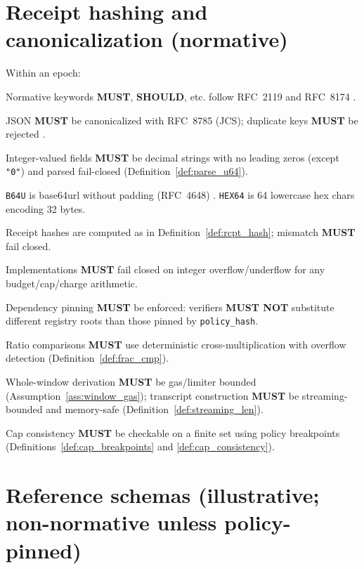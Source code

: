 \documentclass[11pt]{article}
\newcommand{\MUST}{\textbf{MUST}}
\newcommand{\MUSTNOT}{\textbf{MUST NOT}}
\newcommand{\SHOULD}{\textbf{SHOULD}}
\newcommand{\code}[1]{\texttt{#1}}
\newcommand{\1}{\mathbf{1}}
\theoremstyle{definition}
\theoremstyle{plain}
\begin{document}
\section{Receipt hashing and canonicalization (normative)}
Within an epoch:
\begin{tightitemize}
\item Normative keywords \MUST{}, \SHOULD{}, etc. follow RFC~2119 and RFC~8174 \cite{RFC2119,RFC8174}.
\item JSON \MUST{} be canonicalized with RFC~8785 (JCS); duplicate keys \MUST{} be rejected \cite{RFC8785}.
\item Integer-valued fields \MUST{} be decimal strings with no leading zeros (except \texttt{"0"}) and parsed fail-closed (Definition~\ref{def:parse_u64}).
\item \texttt{B64U} is base64url without padding (RFC~4648) \cite{RFC4648}. \texttt{HEX64} is 64 lowercase hex chars encoding 32 bytes.
\item Receipt hashes are computed as in Definition~\ref{def:rcpt_hash}; mismatch \MUST{} fail closed.
\item Implementations \MUST{} fail closed on integer overflow/underflow for any budget/cap/charge arithmetic.
\item Dependency pinning \MUST{} be enforced: verifiers \MUSTNOT{} substitute different registry roots than those pinned by \code{policy\_hash}.
\item Ratio comparisons \MUST{} use deterministic cross-multiplication with overflow detection (Definition~\ref{def:frac_cmp}).
\item Whole-window derivation \MUST{} be gas/limiter bounded (Assumption~\ref{ass:window_gas}); transcript construction \MUST{} be streaming-bounded and memory-safe (Definition~\ref{def:streaming_len}).
\item Cap consistency \MUST{} be checkable on a finite set using policy breakpoints (Definitions~\ref{def:cap_breakpoints} and \ref{def:cap_consistency}).
\end{tightitemize}

\section{Reference schemas (illustrative; non-normative unless policy-pinned)}
\label{sec:schemas_non_norm}
\end{document}
